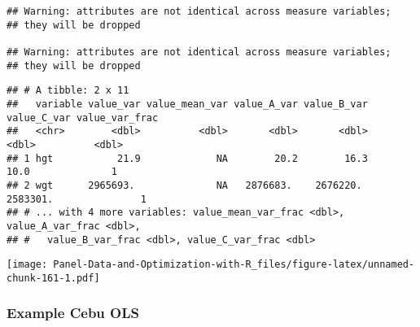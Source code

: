 \documentclass[
]{book}
\newenvironment{Shaded}{\begin{snugshade}}{\end{snugshade}}
\newcommand{\DataTypeTok}[1]{\textcolor[rgb]{0.13,0.29,0.53}{#1}}
\newcommand{\DecValTok}[1]{\textcolor[rgb]{0.00,0.00,0.81}{#1}}
\newcommand{\KeywordTok}[1]{\textcolor[rgb]{0.13,0.29,0.53}{\textbf{#1}}}
\newcommand{\NormalTok}[1]{#1}
\newcommand{\OperatorTok}[1]{\textcolor[rgb]{0.81,0.36,0.00}{\textbf{#1}}}
\begin{document}
\begin{verbatim}
## Warning: attributes are not identical across measure variables;
## they will be dropped

## Warning: attributes are not identical across measure variables;
## they will be dropped
\end{verbatim}

\begin{Shaded}
\end{Shaded}

\begin{verbatim}
## # A tibble: 2 x 11
##   variable value_var value_mean_var value_A_var value_B_var value_C_var value_var_frac
##   <chr>        <dbl>          <dbl>       <dbl>       <dbl>       <dbl>          <dbl>
## 1 hgt           21.9             NA        20.2        16.3        10.0              1
## 2 wgt      2965693.              NA   2876683.    2676220.    2583301.               1
## # ... with 4 more variables: value_mean_var_frac <dbl>, value_A_var_frac <dbl>,
## #   value_B_var_frac <dbl>, value_C_var_frac <dbl>
\end{verbatim}

\begin{Shaded}
\end{Shaded}

\texttt{[image: Panel-Data-and-Optimization-with-R\_files/figure-latex/unnamed-chunk-161-1.pdf]}

\hypertarget{example-cebu-ols}{%
\subsubsection{Example Cebu OLS}\label{example-cebu-ols}}
\end{document}
